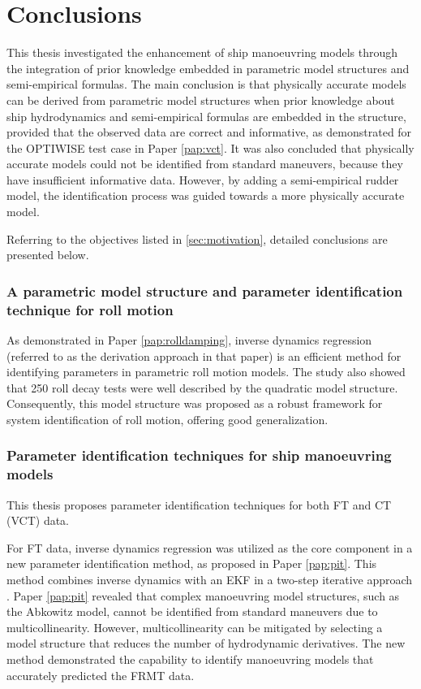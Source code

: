 \chapter{Conclusions\label{ch:conclusions}}

\noindent This thesis investigated the enhancement of ship manoeuvring models through the
integration of prior knowledge embedded in parametric model structures and semi-empirical
formulas. The main conclusion is that physically accurate models
can be derived from parametric model structures when prior knowledge about ship
hydrodynamics and semi-empirical formulas are embedded in the structure, provided
that the observed data are correct and informative, as demonstrated for the OPTIWISE test case in Paper \ref{pap:vct}.
It was also concluded that physically accurate models could not be identified from standard maneuvers, because they have insufficient informative data. However, by adding a semi-empirical rudder model, the identification process was guided towards a more physically accurate model.

Referring to the objectives listed in \autoref{sec:motivation}, detailed conclusions are presented below.

\subsection*{A parametric model structure and parameter identification technique for roll motion}
As demonstrated in Paper \ref{pap:rolldamping}, inverse dynamics regression (referred to as the derivation approach in that paper) is an efficient method for identifying parameters in parametric roll motion models. The study also showed that 250 roll decay tests were well described by the quadratic model structure. Consequently, this model structure was proposed as a robust framework for system identification of roll motion, offering good generalization.

\subsection*{Parameter identification techniques for ship manoeuvring models}
This thesis proposes parameter identification techniques for both FT and CT (VCT) data.

For FT data, inverse dynamics regression was utilized as the core component in a new parameter identification method, as proposed in Paper \ref{pap:pit}. This method combines inverse dynamics with an EKF in a two-step iterative approach \cite{yoonIdentificationHydrodynamicCoefficients2003}. Paper \ref{pap:pit} revealed that complex manoeuvring model structures, such as the Abkowitz model, cannot be identified from standard maneuvers due to multicollinearity. However, multicollinearity can be mitigated by selecting a model structure that reduces the number of hydrodynamic derivatives. The new method demonstrated the capability to identify manoeuvring models that accurately predicted the FRMT data.

